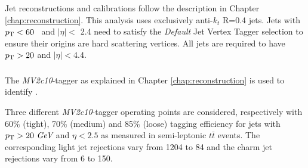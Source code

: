 %
%
%

Jet reconstructions and calibrations follow the description in Chapter \ref{chap:reconstruction}.
This analysis uses exclusively anti-$k_t$ R=0.4 jets.
Jets with $p_{{\rm T}} < 60$ \GeV~and $|\eta| <$ 2.4 need to satisfy the 
\textit{Default} Jet Vertex Tagger selection to ensure their origins are hard scattering vertices.
All jets are required to have $p_{{\rm T}}>20$ \GeV and $|\eta|<4.4$.


\subsubsection{\bjets}

\label{sec:vbf-btagging}
The {\it MV2c10}-tagger as explained in Chapter \ref{chap:reconstruction} is used to identify \bjets.


Three different {\it MV2c10}-tagger operating points are considered, respectively with 60\% (tight), 70\% (medium) and 85\% (loose) tagging efficiency for jets
with $p_{{\rm T}} > 20~\textit{GeV}{}$ and $\eta < 2.5$ as measured in semi-leptonic $t\bar{t}$ events. The corresponding light jet rejections vary from 1204 to 84 and the charm jet rejections vary from 6 to 150.


